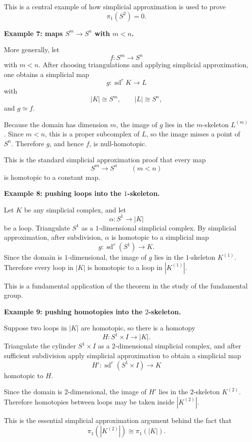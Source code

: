 \documentclass[12pt,a4paper]{article}
\theoremstyle{notespace}
\begin{document}
This is a central example of how simplicial approximation is used to prove
\[
\pi_1(S^2)=0.
\]

\medskip

\textbf{Example 7: maps \(S^m\to S^n\) with \(m<n\).}

More generally, let
\[
f:S^m\to S^n
\]
with \(m<n\). After choosing triangulations and applying simplicial approximation, one obtains a simplicial map
\[
g:\operatorname{sd}^r K \to L
\]
with
\[
|K|\cong S^m,\qquad |L|\cong S^n,
\]
and \(g\simeq f\).

Because the domain has dimension \(m\), the image of \(g\) lies in the \(m\)-skeleton \(L^{(m)}\). Since \(m<n\), this is a proper subcomplex of \(L\), so the image misses a point of \(S^n\). Therefore \(g\), and hence \(f\), is null-homotopic.

This is the standard simplicial approximation proof that every map
\[
S^m\to S^n
\qquad (m<n)
\]
is homotopic to a constant map.

\medskip

\textbf{Example 8: pushing loops into the \(1\)-skeleton.}

Let \(K\) be any simplicial complex, and let
\[
\alpha:S^1\to |K|
\]
be a loop. Triangulate \(S^1\) as a \(1\)-dimensional simplicial complex. By simplicial approximation, after subdivision, \(\alpha\) is homotopic to a simplicial map
\[
g:\operatorname{sd}^r(S^1)\to K.
\]
Since the domain is \(1\)-dimensional, the image of \(g\) lies in the \(1\)-skeleton \(K^{(1)}\). Therefore every loop in \(|K|\) is homotopic to a loop in \(|K^{(1)}|\).

This is a fundamental application of the theorem in the study of the fundamental group.

\medskip

\textbf{Example 9: pushing homotopies into the \(2\)-skeleton.}

Suppose two loops in \(|K|\) are homotopic, so there is a homotopy
\[
H:S^1\times I\to |K|.
\]
Triangulate the cylinder \(S^1\times I\) as a \(2\)-dimensional simplicial complex, and after sufficient subdivision apply simplicial approximation to obtain a simplicial map
\[
H':\operatorname{sd}^r(S^1\times I)\to K
\]
homotopic to \(H\).

Since the domain is \(2\)-dimensional, the image of \(H'\) lies in the \(2\)-skeleton \(K^{(2)}\). Therefore homotopies between loops may be taken inside \(|K^{(2)}|\).

This is the essential simplicial approximation argument behind the fact that
\[
\pi_1(|K^{(2)}|)\cong \pi_1(|K|).
\]
\end{document}
